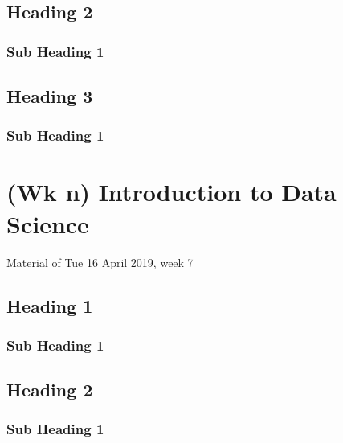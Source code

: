 \documentclass[]{book}
\begin{document}
\hypertarget{heading-2-4}{%
\section{Heading 2}\label{heading-2-4}}

\hypertarget{sub-heading-1-13}{%
\subsection{Sub Heading 1}\label{sub-heading-1-13}}

\hypertarget{heading-3-4}{%
\section{Heading 3}\label{heading-3-4}}

\hypertarget{sub-heading-1-14}{%
\subsection{Sub Heading 1}\label{sub-heading-1-14}}

\hypertarget{wk-n-introduction-to-data-science-1}{%
\chapter{(Wk n) Introduction to Data Science}\label{wk-n-introduction-to-data-science-1}}

Material of Tue 16 April 2019, week 7

\hypertarget{heading-1-5}{%
\section{Heading 1}\label{heading-1-5}}

\hypertarget{sub-heading-1-15}{%
\subsection{Sub Heading 1}\label{sub-heading-1-15}}

\hypertarget{heading-2-5}{%
\section{Heading 2}\label{heading-2-5}}

\hypertarget{sub-heading-1-16}{%
\subsection{Sub Heading 1}\label{sub-heading-1-16}}
\end{document}
